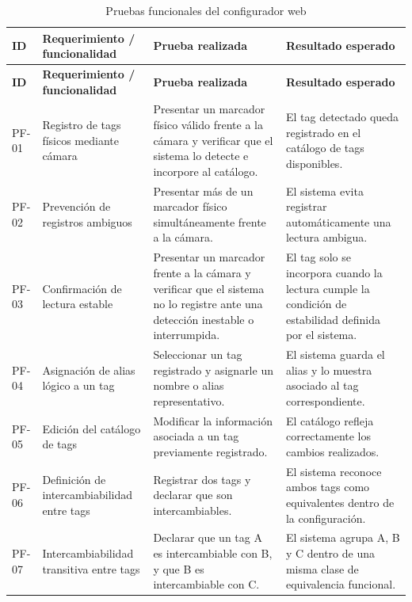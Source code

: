 \documentclass{prgrado}
\begin{document}
\begin{longtable}{L{0.10\textwidth} L{0.25\textwidth} L{0.33\textwidth} L{0.26\textwidth}}
\caption{Pruebas funcionales del configurador web}
\label{tab:pruebas-funcionales-configurador}\\
\toprule
\textbf{ID} & \textbf{Requerimiento / funcionalidad} & \textbf{Prueba realizada} & \textbf{Resultado esperado} \\
\midrule
\endfirsthead

\toprule
\textbf{ID} & \textbf{Requerimiento / funcionalidad} & \textbf{Prueba realizada} & \textbf{Resultado esperado} \\
\midrule
\endhead

PF-01 & Registro de tags físicos mediante cámara & Presentar un marcador físico válido frente a la cámara y verificar que el sistema lo detecte e incorpore al catálogo. & El tag detectado queda registrado en el catálogo de tags disponibles. \\
\midrule

PF-02 & Prevención de registros ambiguos & Presentar más de un marcador físico simultáneamente frente a la cámara. & El sistema evita registrar automáticamente una lectura ambigua. \\
\midrule

PF-03 & Confirmación de lectura estable & Presentar un marcador frente a la cámara y verificar que el sistema no lo registre ante una detección inestable o interrumpida. & El tag solo se incorpora cuando la lectura cumple la condición de estabilidad definida por el sistema. \\
\midrule

PF-04 & Asignación de alias lógico a un tag & Seleccionar un tag registrado y asignarle un nombre o alias representativo. & El sistema guarda el alias y lo muestra asociado al tag correspondiente. \\
\midrule

PF-05 & Edición del catálogo de tags & Modificar la información asociada a un tag previamente registrado. & El catálogo refleja correctamente los cambios realizados. \\
\midrule

PF-06 & Definición de intercambiabilidad entre tags & Registrar dos tags y declarar que son intercambiables. & El sistema reconoce ambos tags como equivalentes dentro de la configuración. \\
\midrule

PF-07 & Intercambiabilidad transitiva entre tags & Declarar que un tag A es intercambiable con B, y que B es intercambiable con C. & El sistema agrupa A, B y C dentro de una misma clase de equivalencia funcional. \\
\midrule


\end{longtable}
\end{document}
